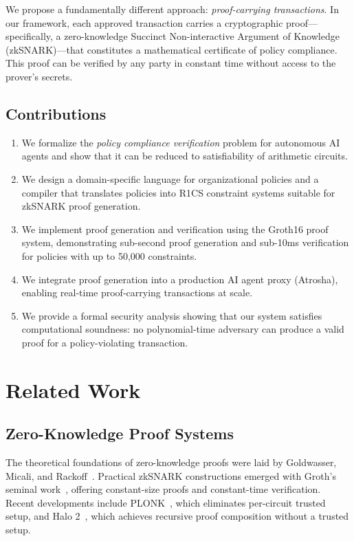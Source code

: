\documentclass[conference]{IEEEtran}
\begin{document}
We propose a fundamentally different approach: \textit{proof-carrying transactions}. In our framework, each approved transaction carries a cryptographic proof---specifically, a zero-knowledge Succinct Non-interactive Argument of Knowledge (zkSNARK)---that constitutes a mathematical certificate of policy compliance. This proof can be verified by any party in constant time without access to the prover's secrets.

\subsection{Contributions}

\begin{enumerate}
    \item We formalize the \textit{policy compliance verification} problem for autonomous AI agents and show that it can be reduced to satisfiability of arithmetic circuits.
    \item We design a domain-specific language for organizational policies and a compiler that translates policies into R1CS constraint systems suitable for zkSNARK proof generation.
    \item We implement proof generation and verification using the Groth16 proof system, demonstrating sub-second proof generation and sub-10ms verification for policies with up to 50,000 constraints.
    \item We integrate proof generation into a production AI agent proxy (Atrosha), enabling real-time proof-carrying transactions at scale.
    \item We provide a formal security analysis showing that our system satisfies computational soundness: no polynomial-time adversary can produce a valid proof for a policy-violating transaction.
\end{enumerate}

\section{Related Work}

\subsection{Zero-Knowledge Proof Systems}

The theoretical foundations of zero-knowledge proofs were laid by Goldwasser, Micali, and Rackoff~\cite{gmr1985}. Practical zkSNARK constructions emerged with Groth's seminal work~\cite{groth16}, offering constant-size proofs and constant-time verification. Recent developments include PLONK~\cite{plonk2019}, which eliminates per-circuit trusted setup, and Halo 2~\cite{halo2}, which achieves recursive proof composition without a trusted setup.
\end{document}
